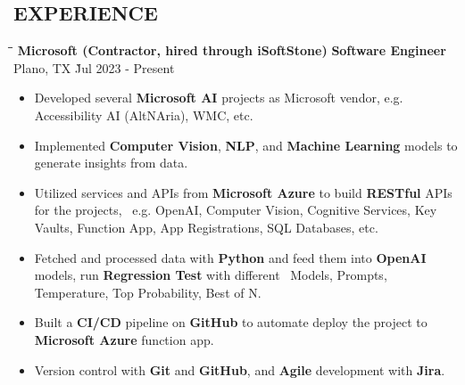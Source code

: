 \documentclass{res}
\begin{document}
\begin{resume}
\section{EXPERIENCE}
    \vspace{0.00in}	
    \begin{tabbing}
    \hspace{3.66in}\= \hspace{1.5in}\= \hspace{1.6in}\= \kill %
    {\bf Microsoft (Contractor, hired through iSoftStone)} \> {\bf Software Engineer}  \>  
                                    Plano, TX    \` Jul 2023 - Present\\
    \end{tabbing}\vspace{-20pt}      %
    \vspace{+0.1in}
    \begin{itemize} \itemsep 1.5pt %
    \item Developed several {\bf Microsoft AI} projects as Microsoft vendor, e.g. Accessibility AI (AltNAria), WMC, etc.
    \item Implemented {\bf Computer Vision}, {\bf NLP}, and {\bf Machine Learning} models to generate insights from data.
    \item Utilized services and APIs from {\bf Microsoft Azure} to build {\bf RESTful} APIs for the projects, \
            e.g. OpenAI, Computer Vision, Cognitive Services, Key Vaults, Function App, App Registrations, SQL Databases, etc.
    \item Fetched and processed data with {\bf Python} and feed them into {\bf OpenAI} models, run {\bf Regression Test} with different \
            Models, Prompts, Temperature, Top Probability, Best of N.
    \item Built a {\bf CI/CD} pipeline on {\bf GitHub} to automate deploy the project to {\bf Microsoft Azure} function app.
    \item Version control with {\bf Git} and {\bf GitHub}, and {\bf Agile} development with {\bf Jira}.
    \end{itemize}



\end{resume}
\end{document}
